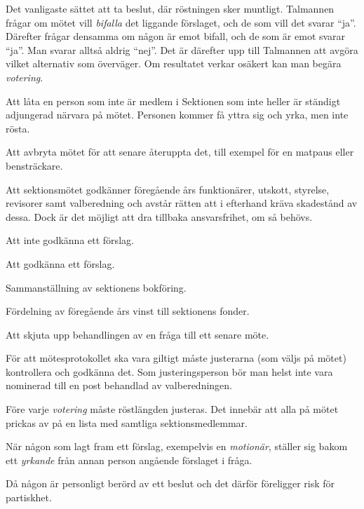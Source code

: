 \documentclass[../_main/handlingar.tex]{subfiles}
\begin{document}
\begin{description}[style=multiline, leftmargin=45mm]
    \item[Acklamation]
    Det vanligaste sättet att ta beslut, där röstningen sker muntligt. Talmannen frågar om mötet vill \emph{bifalla} det liggande förslaget, och de som vill det svarar ``ja''. Därefter frågar densamma om någon är emot bifall, och de som är emot svarar ``ja''. Man svarar alltså aldrig ``nej''. Det är därefter upp till Talmannen att avgöra vilket alternativ som överväger. Om resultatet verkar osäkert kan man begära \emph{votering}.
    \item[Adjungera]
    Att låta en person som inte är medlem i Sektionen som inte heller är ständigt adjungerad närvara på mötet. Personen kommer få yttra sig och yrka, men inte rösta.
    \item[Ajournera]
    Att avbryta mötet för att senare återuppta det, till exempel för en matpaus eller bensträckare.
    \item[Ansvarsfrihet]
    Att sektionsmötet godkänner föregående års funktionärer, utskott, styrelse, revisorer samt valberedning och avstår rätten att i efterhand kräva skadestånd av dessa. Dock är det möjligt att dra tillbaka ansvarsfrihet, om så behövs.
    \item[Avslag]
    Att inte godkänna ett förslag.
    \item[Bifall]
    Att godkänna ett förslag.
    \item[Bokslut]
    Sammanställning av sektionens bokföring.
    \item[Bokslutsdisposition]
    Fördelning av föregående års vinst till sektionens fonder.
    \item[Bordläggning]
    Att skjuta upp behandlingen av en fråga till ett senare möte.
    \item[Justering av protokoll]
    För att mötesprotokollet ska vara giltigt måste justerarna (som väljs på mötet) kontrollera och godkänna det. Som justeringsperson bör man helst inte vara nominerad till en post behandlad av valberedningen.
    \item[Justering av röstlängd]
    Före varje \emph{votering} måste röstlängden justeras. Det innebär att alla på mötet prickas av på en lista med samtliga sektionsmedlemmar.
    \item[Jämka sig] När någon som lagt fram ett förslag, exempelvis en \emph{motionär}, ställer sig bakom ett \emph{yrkande} från annan person angående förslaget i fråga.
    \item[Jäv]
    Då någon är personligt berörd av ett beslut och det därför föreligger risk för partiskhet.

\end{description}
\end{document}
